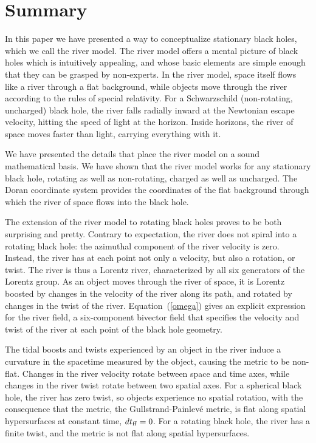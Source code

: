 \documentclass[twocolumn,showpacs,preprintnumbers,amsmath,amssymb,prb]{revtex4}
\begin{document}
\section{Summary}
\label{summary}

In this paper we have presented a
way to conceptualize stationary black holes,
which we call the river model.
The river model offers a mental picture of black holes
which is intuitively appealing,
and whose basic elements are simple enough
that they can be grasped by non-experts.
In the river model, space itself flows like a river through a flat background,
while objects move through the river
according to the rules of special relativity.
For a Schwarzschild (non-rotating, uncharged) black hole,
the river falls radially inward at the Newtonian escape velocity,
hitting the speed of light at the horizon.
Inside horizons, the river of space moves faster than light,
carrying everything with it.

We have presented the details
that place the river model on a sound mathematical basis.
We have shown that the river model works for any stationary black hole,
rotating as well as non-rotating,
charged as well as uncharged.
The Doran \cite{Doran} coordinate system provides the coordinates of
the flat background through which the river of space flows into the black hole.

The extension of the river model to rotating black holes
proves to be both surprising and pretty.
Contrary to expectation, the river does not spiral into a rotating black hole:
the azimuthal component of the river velocity is zero.
Instead,
the river has at each point not only a velocity,
but also a rotation, or twist.
The river is thus a Lorentz river,
characterized by all six generators of the Lorentz group.
As an object moves through the river of space,
it is Lorentz boosted by changes in the velocity of the river along its path,
and rotated by changes in the twist of the river.
Equation~(\ref{omega}) gives an explicit expression for the river field,
a six-component bivector field that specifies the velocity and twist
of the river at each point of the black hole geometry.

The tidal boosts and twists experienced by an object in the river
induce a curvature in the spacetime measured by the object,
causing the metric to be non-flat.
Changes in the river velocity rotate between space and time axes,
while changes in the river twist rotate between two spatial axes.
For a spherical black hole,
the river has zero twist,
so objects experience no spatial rotation,
with the consequence that the metric,
the Gullstrand-Painlev\'e metric,
is flat along spatial hypersurfaces at constant time, $d t_{\rm ff} = 0$.
For a rotating black hole,
the river has a finite twist,
and the metric is not flat along spatial hypersurfaces.
\end{document}
